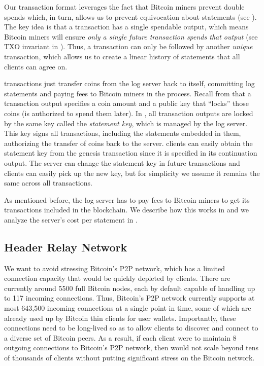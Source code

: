 Our transaction format leverages the fact that Bitcoin miners prevent double spends which, in turn, allows us to prevent equivocation about statements (see ).
The key idea is that a \Sys transaction has a single spendable output, which means Bitcoin miners will ensure \emph{only a single future transaction spends that output} (see TXO invariant in ).
Thus, a \Sys transaction can only be followed by another \emph{unique} \Sys transaction, which allows us to create a linear history of statements that all \Sys clients can agree on.

\Sys transactions just transfer coins from the \Sys log server back to itself, committing log statements and paying fees to Bitcoin miners in the process.
Recall from  that a transaction output specifies a coin amount and a public key that ``locks'' those coins (\ie is authorized to spend them later).
In \Sys, all transaction outputs are locked by the same key called the \emph{statement key}, which is managed by the log server.
This key signs all \Sys transactions, including the statements embedded in them, authorizing the transfer of coins back to the server.
\Sys clients can easily obtain the statement key from the genesis transaction since it is specified in its continuation output.
The server can change the statement key in future transactions and clients can easily pick up the new key, but for simplicity we assume it remains the same across all \Sys transactions.

As mentioned before, the log server has to pay fees to Bitcoin miners to get its transactions included in the blockchain.
We describe how this works in  and we analyze the server's cost per \Sys statement in .


\subsection{Header Relay Network}
\label{sec:catena:design:header-relay}
We want to avoid stressing Bitcoin's P2P network, which has a limited connection capacity that would be quickly depleted by \Sys clients.
There are currently around 5500 full Bitcoin nodes, each by default capable of handling up to 117 incoming connections\cite{bitcoin-bitnodes-21co,bitcoin-p2p}.
Thus, Bitcoin's P2P network currently supports at most 643,500 incoming connections at a single point in time, some of which are already used up by Bitcoin thin clients for user wallets.
Importantly, these connections need to be long-lived so as to allow \Sys clients to discover and connect to a diverse set of Bitcoin peers.
As a result, if each \Sys client were to maintain 8 outgoing connections to Bitcoin's P2P network, then \Sys would not scale beyond tens of thousands of clients without putting significant stress on the Bitcoin network.

